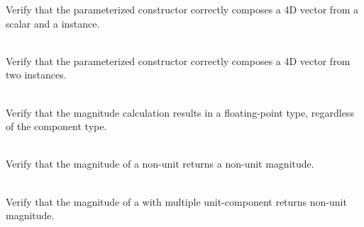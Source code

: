 \begin{DoxyRefList}
\label{test__test000107}%
%
Verify that the  parameterized constructor correctly composes a 4D vector from a scalar and a  instance.  
\item[{\parbox[t]{\linewidth}{Member \doxylink{vectors_2vector4d_2_initialization_tests_8cpp_a5a187bbade6d6f8ed6f917aba6065e4a}{Vector4\+DInitialization\+\_\+\+Two2\+DVectors\+Can\+Initialize\+A4\+DVector} ()}}]\hfill \\
\label{test__test000105}%
%
Verify that the  parameterized constructor correctly composes a 4D vector from two  instances.  
\item[{\parbox[t]{\linewidth}{Member \doxylink{_magnitude_tests_8cpp_a94fda7188a9c870ef0f10cbf062c5584}{Vector4\+DMagnitude\+\_\+\+Magnitude\+Is\+Always\+Typed\+Promoted\+To\+Floating\+Point\+Type} ()}}]\hfill \\
\label{test__test000111}%
%
Verify that the  magnitude calculation results in a floating-\/point type, regardless of the component type.  
\item[{\parbox[t]{\linewidth}{Member \doxylink{_magnitude_tests_8cpp_a21e4a3ee5db8c292595e4300815d31b6}{Vector4\+DMagnitude\+\_\+\+Non\+Unit\+Vector\+Returns\+Correct\+Magnitude} ()}}]\hfill \\
\label{test__test000110}%
%
Verify that the magnitude of a non-\/unit  returns a non-\/unit magnitude.  
\item[{\parbox[t]{\linewidth}{Member \doxylink{_magnitude_tests_8cpp_a57e0074f771605ffa75006a789a1bf38}{Vector4\+DMagnitude\+\_\+\+One\+Component\+Vector\+Returns\+Non\+Unit\+Scalar} ()}}]\hfill \\
\label{test__test000109}%
%
Verify that the magnitude of a  with multiple unit-\/component returns non-\/unit magnitude.  
\item[{\parbox[t]{\linewidth}{Member \doxylink{_magnitude_tests_8cpp_a5bfd2089d9a157b2eec7d5bd8f61f268}{Vector4\+DMagnitude\+\_\+\+Static\+Wrapper\+\_\+\+Non\+Unit\+Vector\+Returns\+Correct\+Magnitude} ()}}]\hfill \\
\label{test__test000112}%

\end{DoxyRefList}
